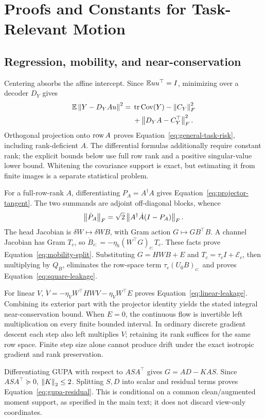 \section{Proofs and Constants for Task-Relevant Motion}
\label{app:task-geometry}
\subsection{Regression, mobility, and near-conservation}
Centering absorbs the affine intercept. Since $\mathbb E uu^\top=I$, minimizing over a decoder $D_Y$ gives
\begin{align}
 \mathbb E\left\lVert Y-D_YAu\right\rVert^2={}&\operatorname{tr}\operatorname{Cov}(Y)-\left\lVert C_Y\right\rVert_F^2\\
 &+\left\lVert D_YA-C_Y^\top\right\rVert_F^2.\nonumber
\end{align}
Orthogonal projection onto $\operatorname{row} A$ proves Equation~\eqref{eq:general-task-risk}, including rank-deficient $A$. The differential formulas additionally require constant rank; the explicit bounds below use full row rank and a positive singular-value lower bound. Whitening the covariance support is exact, but estimating it from finite images is a separate statistical problem.

For a full-row-rank $A$, differentiating $P_A=A^\dagger A$ gives Equation~\eqref{eq:projector-tangent}. The two summands are adjoint off-diagonal blocks, whence
\begin{equation}
 \left\lVert \dot P_A\right\rVert_F=\sqrt2\left\lVert A^\dagger\dot A(I-P_A)\right\rVert_F.
\end{equation}
The head Jacobian is $\delta W\mapsto\delta WB$, with Gram action $G\mapsto GB^\top B$. A channel Jacobian has Gram $T_c$, so $\dot B_{c:}=-\eta_h(W^\top G)_{c:}T_c$. These facts prove Equation~\eqref{eq:mobility-split}. Substituting $G=HWB+E$ and $T_c=\tau_cI+\mathcal E_c$, then multiplying by $Q_B$, eliminates the row-space term $\tau_c(U_0B)_{c:}$ and proves Equation~\eqref{eq:square-leakage}.

For linear $V$, $\dot V=-\eta_VW^\top HWV-\eta_VW^\top E$ proves Equation~\eqref{eq:linear-leakage}. Combining its exterior part with the projector identity yields the stated integral near-conservation bound. When $E=0$, the continuous flow is invertible left multiplication on every finite bounded interval. In ordinary discrete gradient descent each step also left multiplies $V$; retaining its rank suffices for the same row space. Finite step size alone cannot produce drift under the exact isotropic gradient and rank preservation.

Differentiating GUPA with respect to $ASA^\top$ gives $G=AD-KAS$. Since $ASA^\top\succeq0$, $\left\lVert K\right\rVert_2\le2$. Splitting $S,D$ into scalar and residual terms proves Equation~\eqref{eq:gupa-residual}. This is conditional on a common clean/augmented moment support, as specified in the main text; it does not discard view-only coordinates.

